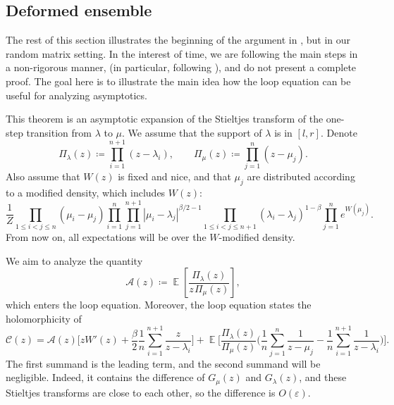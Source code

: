 \documentclass[letterpaper,11pt,oneside,reqno]{book}
\numberwithin{equation}{chapter}  %
\newcommand{\ssp}{\hspace{1pt}}
\theoremstyle{definition}
\begin{document}
\subsection{Deformed ensemble}

The rest of this section
illustrates the beginning of the argument in
\cite{gorin2022dynamical},
but in our random matrix setting.
In the interest of time, we are following the main steps in a non-rigorous manner,
(in particular, following \cite[Section~4.2]{gorin2022dynamical}), and do
not present a complete proof.
The goal here is to illustrate the main idea how the loop equation can be useful for
analyzing asymptotics.

This theorem is an asymptotic expansion of the Stieltjes transform
of the one-step transition from $\lambda$ to $\mu$.
We assume that the support of $\lambda$ is in $[l,r]$.
Denote
\begin{equation*}
	\Pi_\lambda(z)\coloneqq \prod_{i=1}^{n+1}(z-\lambda_i),\qquad
	\Pi_\mu(z)\coloneqq \prod_{j=1}^{n}(z-\mu_j).
\end{equation*}
Also assume that $W(z)$ is fixed and nice, and that $\mu_j$ are
distributed according to a modified
density, which includes $W(z)$:
\begin{equation*}
	\frac{1}{Z}
		\prod_{1\le i<j\le n}(\mu_i-\mu_j)
		\prod_{i=1}^{n}\prod_{j=1}^{n+1} |\mu_i-\lambda_j|^{\beta/2-1}
		\prod_{1\le i<j\le n+1}(\lambda_i-\lambda_j)^{1-\beta}\prod_{j=1}^n e^{W(\mu_j)}.
\end{equation*}
From now on, all expectations will be over the $W$-modified density.

We aim to analyze the quantity
\begin{equation*}
	\mathcal{A}(z)\coloneqq\operatorname{\mathbb{E}}\left[ \frac{\Pi_\lambda(z)}{z\ssp \Pi_\mu(z)} \right],
\end{equation*}
which enters the loop equation. Moreover, the loop equation
states the holomorphicity of
\begin{equation*}
	\mathcal{C}(z)=
	\mathcal{A}(z)\Biggl[z W'(z)+ \frac{\beta}{2}\frac{1}{n}\sum_{i=1}^{n+1}\frac{z}{z-\lambda_i} \Biggr]+
	\operatorname{\mathbb{E}}
	\Biggl[
		\frac{\Pi_\lambda(z)}{\Pi_\mu(z)}\Biggl(\frac{1}{n}\sum_{j=1}^{n}\frac{1}{z-\mu_j}-
		\frac{1}{n}\sum_{i=1}^{n+1}\frac{1}{z-\lambda_i}\Biggr)
	\Biggr].
\end{equation*}
The first summand is the leading term, and the second summand will be
negligible. Indeed, it contains the difference of $G_\mu(z)$ and $G_\lambda(z)$,
and these Stieltjes transforms are close to each other, so the difference is $O(\varepsilon)$.
\end{document}
